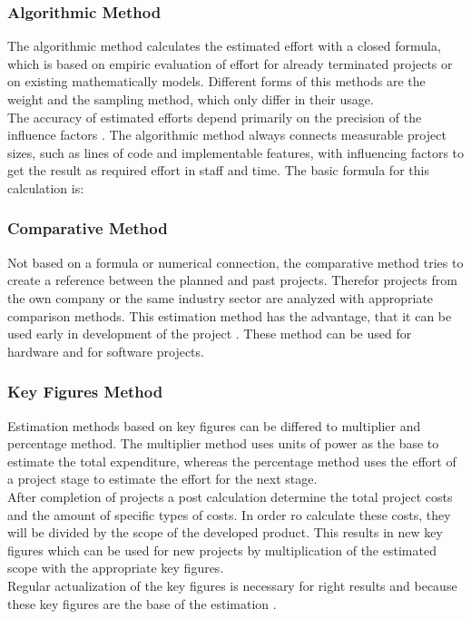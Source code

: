 \subsubsection{Algorithmic Method}

The algorithmic method calculates the estimated effort with a closed formula, which is based on empiric evaluation of effort for already terminated projects or on existing mathematically models. Different forms of this methods are the weight and the sampling method, which only differ in their usage.\\
The accuracy of estimated efforts depend primarily on the precision of the influence factors \cite{itplanung}. The algorithmic method always connects measurable project sizes, such as lines of code and implementable features, with influencing factors to get the result as required effort in staff and time. The basic formula for this calculation is:\\

\subsubsection{Comparative Method}

Not based on a formula or numerical connection, the comparative method tries to create a reference between the planned and past projects. Therefor projects from the own company or the same industry sector are analyzed with appropriate comparison methods. This estimation method has the advantage, that it can be used early in development of the project \cite{itplanung}. These method can be used for hardware and for software projects.

\subsubsection{Key Figures Method}

Estimation methods based on key figures can be differed to multiplier and percentage  method. The multiplier method uses units of power as the base to estimate the total expenditure, whereas the percentage method uses the effort of a project stage to estimate the effort for the next stage.\\
After completion of projects a post calculation determine the total project costs and the amount of specific types of costs. In order ro calculate these costs, they will be divided by the scope of the developed product. This results in new key figures which can be used for new projects by multiplication of the estimated scope with the appropriate key figures.\\
Regular actualization of the key figures is necessary for right results and because these key figures are the base of the estimation \cite{itplanung}.\\

